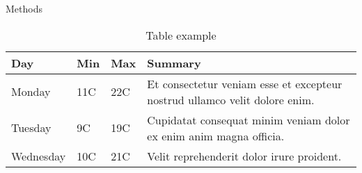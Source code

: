 Methods

\begin{table}[h]
    \centering
    \begin{tabular}{ | l | l | l | p{5cm} |}
    \hline
    Day & Min & Max & Summary \\ \hline
    Monday & 11C & 22C & Et consectetur veniam esse et excepteur nostrud ullamco velit dolore enim. \\ \hline
    Tuesday & 9C & 19C & Cupidatat consequat minim veniam dolor ex enim anim magna officia. \\ \hline
    Wednesday & 10C & 21C & Velit reprehenderit dolor irure proident.\\
    \hline
    \end{tabular}
    \caption{Table example}
    \label{tab: abc}
\end{table}